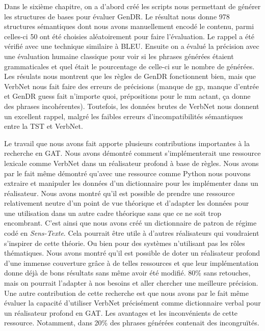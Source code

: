 Dans le sixième chapitre, on a d'abord créé les scripts nous permettant de générer les structures de bases pour évaluer GenDR. Le résultat nous donne 978 structures sémantiques dont nous avons manuellement encodé le contenu, parmi celles-ci 50 ont été choisies aléatoirement pour faire l'évaluation. Le rappel a été vérifié avec une technique similaire à BLEU. Ensuite on a évalué la précision avec une évaluation humaine classique pour voir si les phrases générées étaient grammaticales et quel était le pourcentage de celle-ci sur le nombre de générées. Les résulats nous montrent que les règles de GenDR fonctionnent bien, mais que VerbNet nous fait faire des erreurs de précisions (manque de gp, manque d'entrée et GenDR guess fait n'importe quoi, prépositions pour le mm actant, ça donne des phrases incohérentes). Toutefois, les données brutes de VerbNet nous donnent un excellent rappel, malgré les faibles erreurs d'incompatibilités sémantiques entre la \ac{TST} et VerbNet.  

Le travail que nous avons fait apporte plusieurs contributions importantes à la recherche en \ac{GAT}. Nous avons démontré comment s'implémenterait une ressource lexicale comme VerbNet dans un réalisateur profond à base de règles. Nous avons par le fait même démontré qu'avec une ressource comme Python nous pouvons extraire et manipuler les données d'un dictionnaire pour les implémenter dans un réalisateur. Nous avons montré qu'il est possible de prendre une ressource relativement neutre d'un point de vue théorique et d'adapter les données pour une utilisation dans un autre cadre théorique sans que ce ne soit trop encombrant. C'est ainsi que nous avons créé un dictionnaire de patron de régime codé en \emph{Sens-Texte}. Cela pourrait être utile à d'autres réalisateurs qui voudraient s'inspirer de cette théorie. Ou bien pour des systèmes n'utilisant pas les rôles thématiques. Nous avons montré qu'il est possible de doter un réalisateur profond d'une immense couverture grâce à de telles ressources et que leur implémentation donne déjà de bons résultats sans même avoir été modifié. 80\% sans retouches, mais on pourrait l'adapter à nos besoins et aller chercher une meilleure précision. Une autre contribution de cette recherche est que nous avons par le fait même évaluer la capacité d'utiliser VerbNet précisément comme dictionnaire verbal pour un réalisateur profond en GAT. Les avantages et les inconvénients de cette ressource. Notamment, dans 20\% des phrases générées contenait des incongruïtés.

